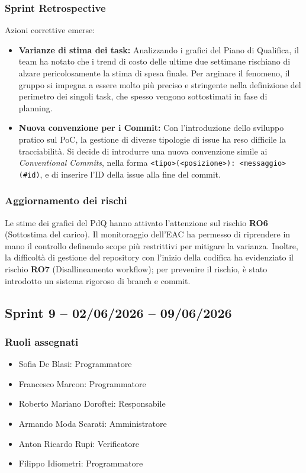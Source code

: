 \subsubsection{Sprint Retrospective}
Azioni correttive emerse:
\begin{itemize}
    \item \textbf{Varianze di stima dei task:} Analizzando i grafici del Piano di Qualifica, il team ha notato che i trend di costo delle ultime due settimane rischiano di alzare pericolosamente la stima di spesa finale. Per arginare il fenomeno, il gruppo si impegna a essere molto più preciso e stringente nella definizione del perimetro dei singoli task, che spesso vengono sottostimati in fase di planning.
    \item \textbf{Nuova convenzione per i Commit:} Con l'introduzione dello sviluppo pratico sul PoC, la gestione di diverse tipologie di issue ha reso difficile la tracciabilità. Si decide di introdurre una nuova convenzione simile ai \textit{Conventional Commits}, nella forma \texttt{<tipo>(<posizione>): <messaggio> (\#id)}, e di inserire l'ID della issue alla fine del commit.
\end{itemize}

\subsubsection{Aggiornamento dei rischi}
Le stime dei grafici del PdQ hanno attivato l'attenzione sul rischio \textbf{RO6} (Sottostima del carico). Il monitoraggio dell'EAC ha permesso di riprendere in mano il controllo definendo scope più restrittivi per mitigare la varianza. Inoltre, la difficoltà di gestione del repository con l'inizio della codifica ha evidenziato il rischio \textbf{RO7} (Disallineamento workflow); per prevenire il rischio, è stato introdotto un sistema rigoroso di branch e commit.

\subsection{Sprint 9 -- 02/06/2026 -- 09/06/2026}
\label{sec:sprint9}

\subsubsection{Ruoli assegnati}
\begin{itemize}
    \item Sofia De Blasi: Programmatore
    \item Francesco Marcon: Programmatore
    \item Roberto Mariano Doroftei: Responsabile
    \item Armando Moda Scarati: Amministratore
    \item Anton Ricardo Rupi: Verificatore
    \item Filippo Idiometri: Programmatore
\end{itemize}

